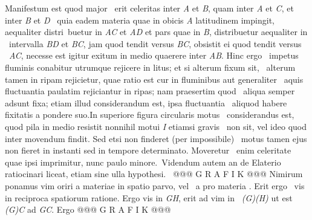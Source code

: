                     Manifestum est quod major \ erit celeritas\protect{} inter \textit{A} et \textit{B}, quam inter \textit{A} et \textit{C}, et inter \textit{B} et \textit{D} \ quia eadem materia quae in obicis \textit{A} latitudinem impingit, aequaliter distri\ buetur in  \textit{AC} et \textit{AD} et pars quae in \textit{B}, distribuetur aequaliter in \ intervalla \textit{BD} et \textit{BC}, jam quod tendit versus \textit{BC}, obsistit ei quod tendit versus \ \textit{AC}, necesse est igitur exitum in medio quaerere inter \textit{AB}. Hinc ergo \ impetus\protect{} fluminis conabitur utrumque rejicere in litus; et si alterum fixum sit, \ alterum tamen in ripam rejicietur, quae ratio est cur in fluminibus aut generaliter \ aquis fluctuantia paulatim rejiciantur in ripas; nam praesertim quod \ aliqua semper adsunt fixa; etiam illud considerandum est, ipsa fluctuantia \ aliquod habere fixitatis a pondere suo.\pend \pstart  In superiore figura circularis motus \ considerandus est, quod pila\protect{} in medio resistit nonnihil motui \textit{I} etiamsi gravis \ non sit, vel ideo quod inter movendum findit. Sed etsi non finderet (per impossibile) \ motus tamen ejus non fieret in instanti sed in tempore determinato. Moveretur \ enim celeritate\protect{} quae ipsi imprimitur, nunc paulo minore.\pend \pstart \ Videndum autem an de Elaterio\protect{} ratiocinari liceat, etiam sine ulla hypothesi. \ @@@ G R A F I K @@@ Nimirum ponamus vim oriri a  materiae in spatio parvo, vel \ a  pro materia . Erit ergo \ vis in reciproca spatiorum ratione. Ergo vis in \textit{GH}, erit ad vim in \ \textit{(G)(H)} ut est \textit{(G)C} ad \textit{GC}. Ergo @@@ G R A F I K @@@%
